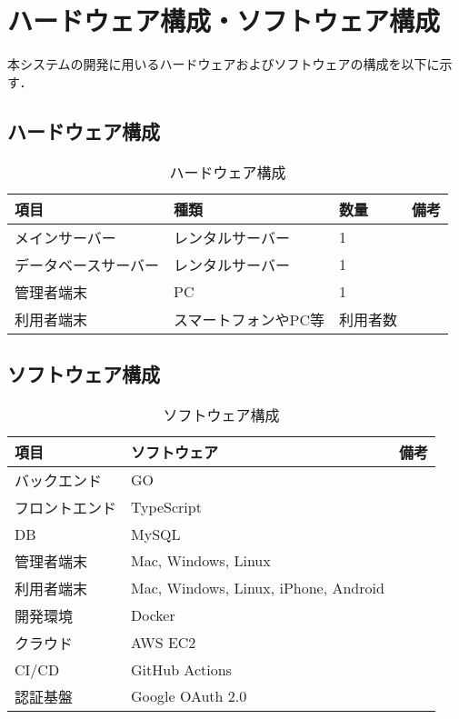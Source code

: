 \section{ハードウェア構成・ソフトウェア構成}
本システムの開発に用いるハードウェアおよびソフトウェアの構成を以下に示す．
\subsection{ハードウェア構成}
\begin{table}[]
    \centering
    \caption{ハードウェア構成}
    \label{tab:hardware}
    \begin{tabular}{llll}
    \hline
    項目         & 種類          & 数量   & 備考 \\ \hline
    メインサーバー    & レンタルサーバー    & 1    &    \\
    データベースサーバー & レンタルサーバー    & 1    &    \\
    管理者端末      & PC          & 1    &    \\
    利用者端末      & スマートフォンやPC等 & 利用者数 &    \\ \hline
    \end{tabular}
\end{table}

\subsection{ソフトウェア構成}
\begin{table}[]
    \centering
    \caption{ソフトウェア構成}
    \label{tab:software}
    \begin{tabular}{lll}
    \hline
    項目      & ソフトウェア                               & 備考 \\ \hline
    バックエンド  & GO                                   &    \\
    フロントエンド & TypeScript                           &    \\
    DB      & MySQL                                &    \\
    管理者端末   & Mac, Windows, Linux                  &    \\
    利用者端末   & Mac, Windows, Linux, iPhone, Android &    \\
    開発環境    & Docker                               &    \\
    クラウド    & AWS EC2                              &    \\
    CI/CD   & GitHub Actions                       &    \\
    認証基盤    & Google OAuth 2.0                     &    \\ \hline
    \end{tabular}
\end{table}